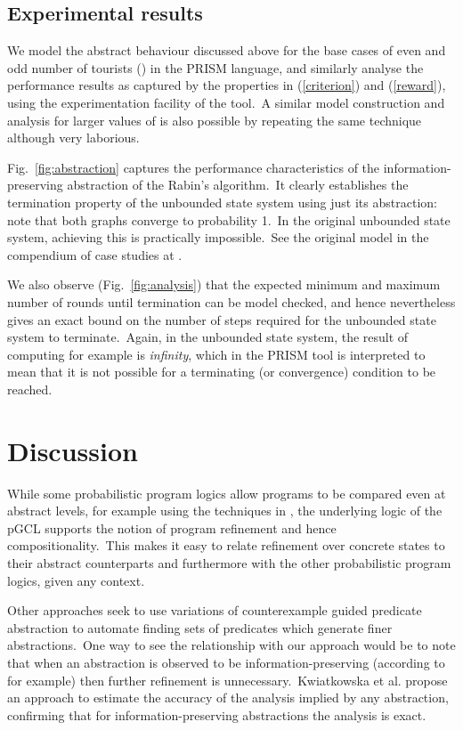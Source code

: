 \documentclass[numbers,copyright,creativecommons]{eptcs}
\newcommand{\figg}[1]{Fig.~\ref{#1}}
\begin{document}
\subsection{Experimental results}
We model the abstract behaviour discussed above for the base cases of even and odd number of tourists () in the PRISM language, and similarly analyse the performance results as captured by the properties in (\ref{criterion}) and (\ref{reward}), using the experimentation facility of the tool.\ A similar model construction and analysis for larger values of  is also possible by repeating the same technique although very laborious.

\figg{fig:abstraction} captures the performance characteristics of the information-preserving abstraction of the Rabin's algorithm.\ It clearly establishes the termination property of the unbounded state system using just its abstraction: note that both graphs converge to probability 1.\ In the original unbounded state system, achieving this is practically impossible.\ See the original model in the compendium of case studies at \cite{PRISM}.

We also observe (\figg{fig:analysis}) that the expected minimum and maximum number of rounds until termination can be model checked, and hence nevertheless gives an exact bound on the number of steps required for the unbounded state system to terminate.\ Again, in the unbounded state system, the result of computing  for example is {\it infinity}, which in the PRISM tool is interpreted to mean that it is not possible for a terminating (or convergence) condition to be reached.

\section{Discussion}

While some probabilistic program logics allow programs to be compared even at abstract levels, for example using the techniques
in \cite{LS91, JS90}, the underlying logic of the pGCL supports the notion of program refinement and hence compositionality.\ This
 makes it easy to relate refinement over concrete states to their abstract counterparts and furthermore with the other 
 probabilistic program logics, given any context.

Other approaches seek to use variations of counterexample guided predicate abstraction \cite{VMCAI,CEGAR} to automate finding sets of predicates which generate finer abstractions.\ One way to see the relationship with our approach would be to note that when an abstraction is observed to be
information-preserving (according to  for example) then further refinement is unnecessary.\ Kwiatkowska et al. \cite{QEST} propose an approach to estimate the accuracy of the analysis implied by any abstraction, confirming that for information-preserving abstractions the analysis is exact.
\end{document}
